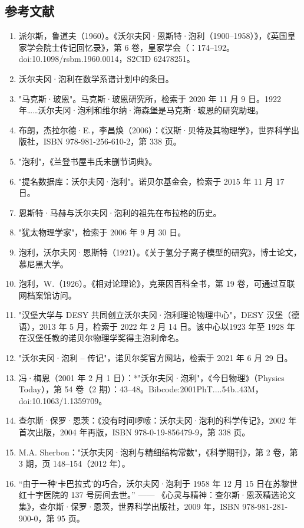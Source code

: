 \subsection{参考文献} 
\begin{enumerate}
\item 派尔斯，鲁道夫（1960）。《沃尔夫冈·恩斯特·泡利（1900–1958）》，《英国皇家学会院士传记回忆录》，第 6 卷，皇家学会（：174–192。doi:10.1098/rsbm.1960.0014，S2CID 62478251。  
\item 沃尔夫冈·泡利在数学系谱计划中的条目。  
\item "马克斯·玻恩"。马克斯·玻恩研究所，检索于 2020 年 11 月 9 日。1922 年……沃尔夫冈·泡利和维尔纳·海森堡是马克斯·玻恩的研究助理。  
\item 布朗，杰拉尔德·E.，李昌焕（2006）：《汉斯·贝特及其物理学》，世界科学出版社，ISBN 978-981-256-610-2，第 338 页。  
\item "泡利"，《兰登书屋韦氏未删节词典》。  
\item "提名数据库：沃尔夫冈·泡利"。诺贝尔基金会，检索于 2015 年 11 月 17 日。  
\item 恩斯特·马赫与沃尔夫冈·泡利的祖先在布拉格的历史。  
\item "犹太物理学家"，检索于 2006 年 9 月 30 日。  
\item 泡利，沃尔夫冈·恩斯特（1921）。《关于氢分子离子模型的研究》，博士论文，慕尼黑大学。  
\item 泡利，W.（1926）。《相对论理论》，克莱因百科全书，第 19 卷，可通过互联网档案馆访问。
\item "汉堡大学与 DESY 共同创立沃尔夫冈·泡利理论物理中心"，DESY 汉堡（德语），2013 年 5 月，检索于 2022 年 2 月 14 日。该中心以1923 年至 1928 年在汉堡任教的诺贝尔物理学奖得主泡利命名。  
\item "沃尔夫冈·泡利 – 传记"，诺贝尔奖官方网站，检索于 2021 年 6 月 29 日。  
\item 冯·梅恩（2001 年 2 月 1 日）：*"沃尔夫冈·泡利"，《今日物理》（Physics Today），第 54 卷（2 期）：43–48。Bibcode:2001PhT....54b..43M，doi:10.1063/1.1359709。  
\item 查尔斯·保罗·恩茨：《没有时间啰嗦：沃尔夫冈·泡利的科学传记》，2002 年首次出版，2004 年再版，ISBN 978-0-19-856479-9，第 338 页。  
\item M.A. Sherbon："沃尔夫冈·泡利与精细结构常数"，《科学期刊》，第 2 卷，第 3 期，页 148–154（2012 年）。  
\item “由于一种‘卡巴拉式’的巧合，沃尔夫冈·泡利于 1958 年 12 月 15 日在苏黎世红十字医院的 137 号房间去世。” —— 《心灵与精神：查尔斯·恩茨精选论文集》，查尔斯·保罗·恩茨，世界科学出版社，2009 年，ISBN 978-981-281-900-0，第 95 页。  

\end{enumerate}
